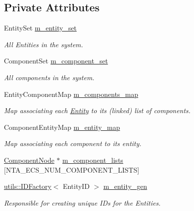 \subsection*{Private Attributes}
\begin{DoxyCompactItemize}
\item 
\mbox{\label{classnta_1_1ECS_abd914b89f79ea39e02d410e9d709a845}} 
Entity\+Set \hyperlink{classnta_1_1ECS_abd914b89f79ea39e02d410e9d709a845}{m\+\_\+entity\+\_\+set}
\begin{DoxyCompactList}\small\item\em All Entities in the system. \end{DoxyCompactList}\item 
\mbox{\label{classnta_1_1ECS_a977c7be937b70dd273153b67a1faf9a5}} 
Component\+Set \hyperlink{classnta_1_1ECS_a977c7be937b70dd273153b67a1faf9a5}{m\+\_\+component\+\_\+set}
\begin{DoxyCompactList}\small\item\em All components in the system. \end{DoxyCompactList}\item 
\mbox{\label{classnta_1_1ECS_aa7069093670285de8ae96f5a8f6e7272}} 
Entity\+Component\+Map \hyperlink{classnta_1_1ECS_aa7069093670285de8ae96f5a8f6e7272}{m\+\_\+components\+\_\+map}
\begin{DoxyCompactList}\small\item\em Map associating each \hyperlink{classnta_1_1Entity}{Entity} to its (linked) list of components. \end{DoxyCompactList}\item 
\mbox{\label{classnta_1_1ECS_ab5c3a72aaaa0d6afef6f7bd7a0ee9c02}} 
Component\+Entity\+Map \hyperlink{classnta_1_1ECS_ab5c3a72aaaa0d6afef6f7bd7a0ee9c02}{m\+\_\+entity\+\_\+map}
\begin{DoxyCompactList}\small\item\em Map associating each component to its entity. \end{DoxyCompactList}\item 
\hyperlink{structnta_1_1ComponentNode}{Component\+Node} $\ast$ \hyperlink{classnta_1_1ECS_a2d45b9e54bcc636faac7cbb403b478bd}{m\+\_\+component\+\_\+lists} \mbox{[}N\+T\+A\+\_\+\+E\+C\+S\+\_\+\+N\+U\+M\+\_\+\+C\+O\+M\+P\+O\+N\+E\+N\+T\+\_\+\+L\+I\+S\+TS\mbox{]}
\item 
\mbox{\label{classnta_1_1ECS_a8c2683281c1f6bfdc2765cca5059c8af}} 
\hyperlink{classnta_1_1utils_1_1IDFactory}{utils\+::\+I\+D\+Factory}$<$ Entity\+ID $>$ \hyperlink{classnta_1_1ECS_a8c2683281c1f6bfdc2765cca5059c8af}{m\+\_\+entity\+\_\+gen}
\begin{DoxyCompactList}\small\item\em Responsible for creating unique I\+Ds for the Entities. \end{DoxyCompactList}\end{DoxyCompactItemize}


